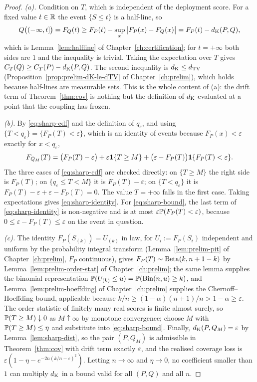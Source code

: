 \documentclass[../../../main.tex]{subfiles}
\begin{document}
\begin{proof}
\emph{(a).} Condition on $T$, which is independent of the deployment score. For a fixed value $t\in\mathbb{R}$ the event $\{S\le t\}$ is a half-line, so
\[
Q\big((-\infty,t]\big)=F_Q(t)\ge F_P(t)-\sup_x\big|F_P(x)-F_Q(x)\big|=F_P(t)-d_{\mathrm{K}}(P,Q),
\]
which is Lemma~\ref{lem:halfline} of Chapter~\ref{ch:certification}; for $t=+\infty$ both sides are $1$ and the inequality is trivial. Taking the expectation over $T$ gives $C_T(Q)\ge C_T(P)-d_{\mathrm{K}}(P,Q)$. The second inequality is $d_{\mathrm{K}}\le d_{\mathrm{TV}}$ (Proposition~\ref{prop:prelim-dK-le-dTV} of Chapter~\ref{ch:prelim}), which holds because half-lines are measurable sets. This is the whole content of (a): the drift term of Theorem~\ref{thm:cov} is nothing but the definition of $d_{\mathrm{K}}$ evaluated at a point that the coupling has frozen.

\emph{(b).} By \eqref{eq:sharp-cdf} and the definition of $q_\varepsilon$, and using $\{T<q_\varepsilon\}=\{F_P(T)<\varepsilon\}$, which is an identity of events because $F_P(x)<\varepsilon$ exactly for $x<q_\varepsilon$,
\[
F_{Q_M}(T)=\big(F_P(T)-\varepsilon\big)+\varepsilon\mathbf{1}\{T\ge M\}+\big(\varepsilon-F_P(T)\big)\mathbf{1}\{F_P(T)<\varepsilon\}.
\]
The three cases of \eqref{eq:sharp-cdf} are checked directly: on $\{T\ge M\}$ the right side is $F_P(T)$; on $\{q_\varepsilon\le T<M\}$ it is $F_P(T)-\varepsilon$; on $\{T<q_\varepsilon\}$ it is $F_P(T)-\varepsilon+\varepsilon-F_P(T)=0$. The value $T=+\infty$ falls in the first case. Taking expectations gives \eqref{eq:sharp-identity}. For \eqref{eq:sharp-bound}, the last term of \eqref{eq:sharp-identity} is non-negative and is at most $\varepsilon\mathbb{P}(F_P(T)<\varepsilon)$, because $0\le\varepsilon-F_P(T)\le\varepsilon$ on the event in question.

\emph{(c).} The identity $F_P(S_{(k)})=U_{(k)}$ in law, for $U_i:=F_P(S_i)$ independent and uniform by the probability integral transform (Lemma~\ref{lem:prelim-pit} of Chapter~\ref{ch:prelim}, $F_P$ continuous), gives $F_P(T)\sim\operatorname{Beta}(k,n+1-k)$ by Lemma~\ref{lem:prelim-order-stat} of Chapter~\ref{ch:prelim}; the same lemma supplies the binomial representation $\mathbb{P}(U_{(k)}\le u)=\mathbb{P}(\mathrm{Bin}(n,u)\ge k)$, and Lemma~\ref{lem:prelim-hoeffding} of Chapter~\ref{ch:prelim} supplies the Chernoff--Hoeffding bound, applicable because $k/n\ge(1-\alpha)(n+1)/n>1-\alpha\ge\varepsilon$. The order statistic of finitely many real scores is finite almost surely, so $\mathbb{P}(T\ge M)\downarrow0$ as $M\uparrow\infty$ by monotone convergence; choose $M$ with $\mathbb{P}(T\ge M)\le\eta$ and substitute into \eqref{eq:sharp-bound}. Finally, $d_{\mathrm{K}}(P,Q_M)=\varepsilon$ by Lemma~\ref{lem:sharp-dist}, so the pair $(P,Q_M)$ is admissible in Theorem~\ref{thm:cov} with drift term exactly $\varepsilon$, and the realised coverage loss is $\varepsilon(1-\eta-e^{-2n(k/n-\varepsilon)^2})$. Letting $n\to\infty$ and $\eta\to0$, no coefficient smaller than $1$ can multiply $d_{\mathrm{K}}$ in a bound valid for all $(P,Q)$ and all $n$.
\end{proof}
\end{document}
